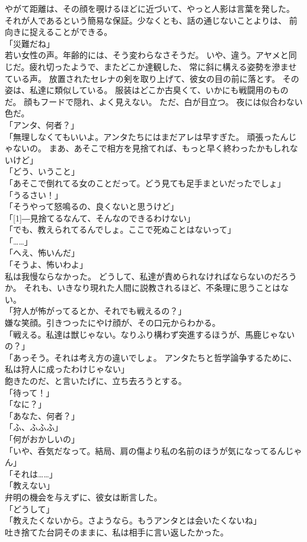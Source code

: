 \documentclass[../IHMain]{subfiles}
\begin{document}
やがて距離は、その顔を覗けるほどに近づいて、やっと人影は言葉を発した。
それが人であるという簡易な保証。少なくとも、話の通じないことよりは、
前向きに捉えることができる。\\
「災難だね」\\
若い女性の声。年齢的には、そう変わらなさそうだ。
いや、違う。アヤメと同じだ。疲れ切ったようで、またどこか達観した、
常に斜に構える姿勢を滲ませている声。
放置されたセレナの剣を取り上げて、彼女の目の前に落とす。
その姿は、私達に類似している。
服装はどこか古臭くて、いかにも戦闘用のものだ。
顔もフードで隠れ、よく見えない。
ただ、白が目立つ。
夜には似合わない色だ。\\
「アンタ、何者？」\\
「無理しなくてもいいよ。アンタたちにはまだアレは早すぎた。
頑張ったんじゃないの。
まあ、あそこで相方を見捨てれば、もっと早く終わったかもしれないけど」\\
「どう、いうこと」\\
「あそこで倒れてる女のことだって。どう見ても足手まといだったでしょ」\\
「うるさい！」\\
「そうやって怒鳴るの、良くないと思うけど」\\
「\scalebox{3}[1]{―}見捨てるなんて、そんなのできるわけない」\\
「でも、教えられてるんでしょ。ここで死ぬことはないって」\\
「……」\\
「へえ、怖いんだ」\\
「そうよ、怖いわよ」\\
私は我慢ならなかった。
どうして、私達が責められなければならないのだろうか。
それも、いきなり現れた人間に説教されるほど、不条理に思うことはない。\\
「狩人が怖がってるとか、それでも戦えるの？」\\
嫌な笑顔。引きつったにやけ顔が、その口元からわかる。\\
「戦える。私達は獣じゃない。なりふり構わず突進するほうが、馬鹿じゃないの？」\\
「あっそう。それは考え方の違いでしょ。
アンタたちと哲学論争するために、私は狩人に成ったわけじゃない」\\
飽きたのだ、と言いたげに、立ち去ろうとする。\\
「待って！」\\
「なに？」\\
「あなた、何者？」\\
「ふ、ふふふ」\\
「何がおかしいの」\\
「いや、呑気だなって。結局、肩の傷より私の名前のほうが気になってるんじゃん」\\
「それは……」\\
「教えない」\\
弁明の機会を与えずに、彼女は断言した。\\
「どうして」\\
「教えたくないから。さようなら。もうアンタとは会いたくないね」\\
吐き捨てた台詞そのままに、私は相手に言い返したかった。
\end{document}
